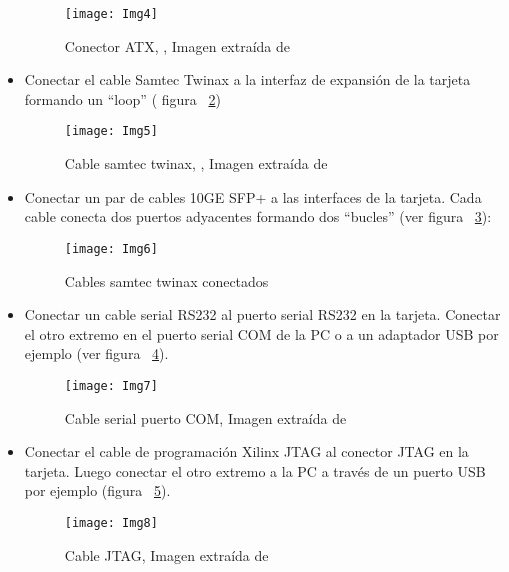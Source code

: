 \begin{itemize}
\begin{figure}[htbp!] 
\centering    
\texttt{[image: Img4]}
\caption[Conector ATX]{Conector ATX, , Imagen extra\'ida de \citep{NetFPGA6}}
\label{fig:Img4}
\end{figure}

\item Conectar el cable Samtec Twinax a la interfaz de expansión de la tarjeta formando un “loop” ( figura ~\ref{fig:Img5})

\newpage
\begin{figure}[htbp!] 
\centering    
\texttt{[image: Img5]}
\caption[Cable samtec twinax]{Cable samtec twinax, , Imagen extra\'ida de \citep{NetFPGA6}}
\label{fig:Img5}
\end{figure}

\item Conectar un par de cables 10GE SFP+ a las interfaces de la tarjeta. Cada cable conecta dos puertos adyacentes formando dos “bucles” (ver figura ~\ref{fig:Img6}):

\begin{figure}[htbp!] 
\centering    
\texttt{[image: Img6]}
\caption[Cables samtec twinax conectados]{Cables samtec twinax conectados}
\label{fig:Img6}
\end{figure}

\item Conectar un cable serial RS232 al puerto serial RS232 en la tarjeta. Conectar el otro extremo en el puerto serial COM de la PC o a un adaptador USB por ejemplo (ver figura ~\ref{fig:Img7}).

\begin{figure}[htbp!] 
\centering    
\texttt{[image: Img7]}
\caption[Cable serial puerto COM]{Cable serial puerto COM, Imagen extra\'ida de \citep{NetFPGA6}}
\label{fig:Img7}
\end{figure}

\item Conectar el cable de programación Xilinx JTAG al conector JTAG en la tarjeta. Luego conectar el otro extremo a la PC a través de un puerto USB por ejemplo (figura ~\ref{fig:Img8}).

\newpage
\begin{figure}[htbp!] 
\centering    
\texttt{[image: Img8]}
\caption[Cable JTAG]{Cable JTAG, Imagen extra\'ida de \citep{NetFPGA6}}
\label{fig:Img8}
\end{figure}

\end{itemize}

